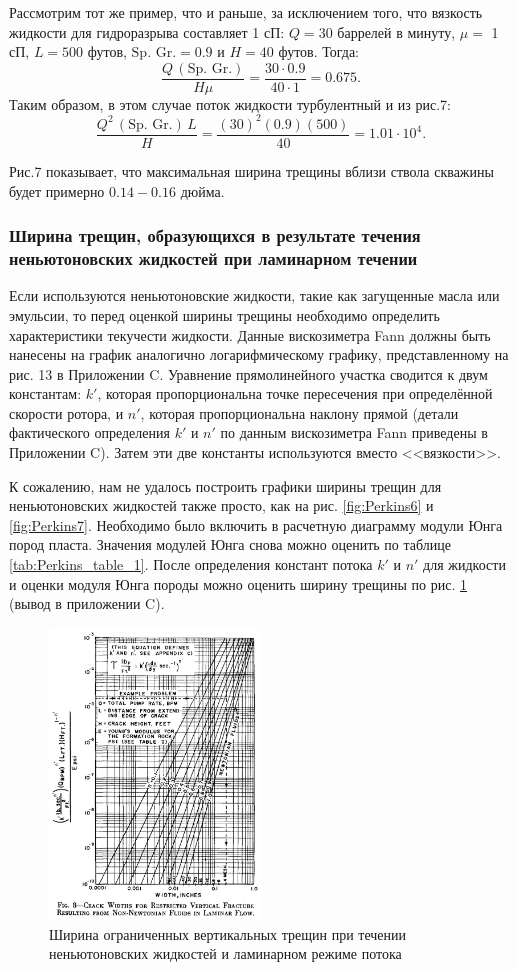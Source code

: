 \documentclass[a4paper, 12pt]{article}
\begin{document}
Рассмотрим тот же пример, что и раньше, за исключением того, что вязкость жидкости для гидроразрыва составляет 1 сП: $Q = 30$ баррелей в минуту, $\mu =$ 1 сП, $L=500$ футов, $\text{Sp. Gr.}=0.9$ и $H = 40$ футов.
Тогда:
$$
\frac{Q\,(\text{Sp. Gr.})}{H\mu}=\frac{30\cdot 0.9}{40\cdot 1}=0.675.
$$
Таким образом, в этом случае поток жидкости турбулентный и из рис.7:
$$
\frac{Q^2\,(\text{Sp. Gr.})\,L}{H}=\frac{(30)^2(0.9)(500)}{40}=1.01\cdot 10^4.
$$

Рис.7 показывает, что максимальная ширина трещины вблизи ствола скважины будет примерно $0.14-0.16$ дюйма.

\subsubsection{Ширина трещин, образующихся в результате течения неньютоновских жидкостей при ламинарном течении}

Если используются неньютоновские жидкости, такие как загущенные масла или эмульсии, то перед оценкой ширины трещины необходимо определить характеристики текучести жидкости.
Данные вискозиметра Fann должны быть нанесены на график аналогично логарифмическому графику, представленному на рис. 13 в Приложении C.
Уравнение прямолинейного участка сводится к двум константам: $k'$, которая пропорциональна точке пересечения при определённой скорости ротора, и $n'$, которая пропорциональна наклону прямой
(детали фактического определения $k'$ и $n'$ по данным вискозиметра Fann приведены в Приложении C).
Затем эти две константы используются вместо <<вязкости>>.

К сожалению, нам не удалось построить графики ширины трещин для неньютоновских жидкостей также просто, как на рис. \ref{fig:Perkins6} и \ref{fig:Perkins7}.
Необходимо было включить в расчетную диаграмму модули Юнга пород пласта.
Значения модулей Юнга снова можно оценить по таблице \ref{tab:Perkins_table_1}.
После определения констант потока $k'$ и $n'$ для жидкости и оценки модуля Юнга породы можно оценить ширину трещины по рис. \ref{fig:Perkins8} (вывод в приложении C).

\begin{figure}[H]
\center
\includegraphics[width=0.5\textwidth]{Perkins_8}
\caption{Ширина ограниченных вертикальных трещин при течении неньютоновских жидкостей и ламинарном режиме потока}
\label{fig:Perkins8}
\end{figure}
\end{document}
